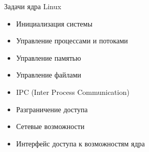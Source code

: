 \begin{frame}{Задачи ядра Linux}
	\begin{itemize}
		\item Инициализация системы
		\item Управление процессами и потоками
		\item Управление памятью
		\item Управление файлами
		\item IPC (Inter Process Communication)
		\item Разграничение доступа
		\item Сетевые возможности
		\item Интерфейс доступа к возможностям ядра
	\end{itemize}
\end{frame}

